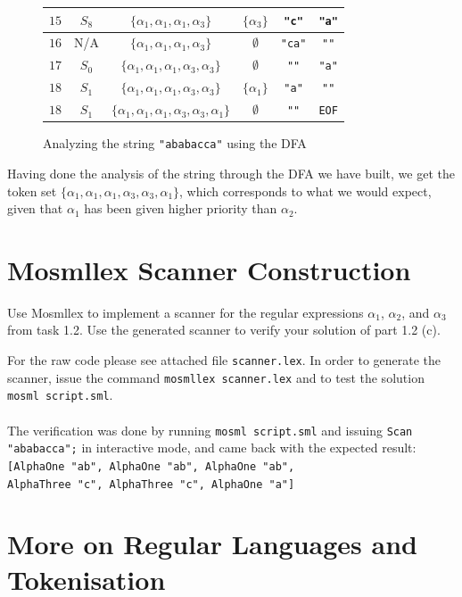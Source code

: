 \documentclass[11pt,a4paper]{article}
\begin{document}
\begin{figure}[H]
\begin{tabular}{|c|c|c|c|c|c|}
		\\ \hline
		$15$ & $S_8$ & $\{\alpha_1,\alpha_1,\alpha_1,\alpha_3\}$ & $\{\alpha_3\}$ & {\tt "c"} & {\tt "a"}
		\\ \hline
		$16$ & N/A & $\{\alpha_1,\alpha_1,\alpha_1,\alpha_3\}$ & $\emptyset$ & {\tt "ca"} & {\tt ""}
		\\ \hline
		$17$ & $S_0$ & $\{\alpha_1,\alpha_1,\alpha_1,\alpha_3,\alpha_3\}$ & $\emptyset$ & {\tt ""} & {\tt "a"}
		\\ \hline
		$18$ & $S_1$ & $\{\alpha_1,\alpha_1,\alpha_1,\alpha_3,\alpha_3\}$ & $\{\alpha_1\}$ & {\tt "a"} & {\tt ""}
		\\ \hline
		$18$ & $S_1$ & $\{\alpha_1,\alpha_1,\alpha_1,\alpha_3,\alpha_3,\alpha_1\}$ & $\emptyset$ & {\tt ""} & {\tt EOF}
		\\ \hline
	\end{tabular}
	\label{table:backtracking}
	\caption{Analyzing the string {\tt "ababacca"} using the DFA}
\end{figure}
Having done the analysis of the string through the DFA we have built, we get
the token set $\{\alpha_1,\alpha_1,\alpha_1,\alpha_3,\alpha_3,\alpha_1\}$,
which corresponds to what we would expect, given that $\alpha_1$ has been
given higher priority than $\alpha_2$.

\newpage
\section{Mosmllex Scanner Construction}
Use Mosmllex to implement a scanner for the regular expressions $\alpha_1$,
$\alpha_2$, and $\alpha_3$ from task 1.2. Use the generated scanner to verify
your solution of part 1.2 (c).

For the raw code please see attached file {\tt scanner.lex}. In order to
generate the scanner, issue the command {\tt mosmllex scanner.lex} and to test
the solution {\tt mosml script.sml}.
\\\\
The verification was done by running {\tt mosml script.sml} and issuing
{\tt Scan "ababacca";} in interactive mode, and came back with the expected
result:\\
{\tt [AlphaOne "ab", AlphaOne "ab", AlphaOne "ab",\\AlphaThree "c", AlphaThree
"c", AlphaOne "a"]}

\section{More on Regular Languages and Tokenisation}
\end{document}
